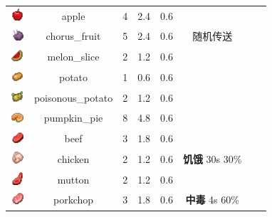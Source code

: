 \begin{center}
\begin{longtable}{c|c|ccc|ccc}
        \includegraphics[width=0.5cm,height=0.5cm]{./images/origin/apple.png} & apple & 4 & 2.4 & 0.6 &  \\
        \includegraphics[width=0.5cm,height=0.5cm]{./images/origin/chorus_fruit.png} & chorus\_fruit & 5 & 2.4 & 0.6 & 随机传送 \\ 
        \includegraphics[width=0.5cm,height=0.5cm]{./images/origin/melon_slice.png} & melon\_slice & 2 & 1.2 & 0.6 &  \\ 
        \includegraphics[width=0.5cm,height=0.5cm]{./images/origin/potato.png} & potato & 1 & 0.6 & 0.6 &  \\ 
        \includegraphics[width=0.5cm,height=0.5cm]{./images/origin/poisonous_potato.png} & poisonous\_potato & 2 & 1.2 & 0.6 &  \\ 
        \includegraphics[width=0.5cm,height=0.5cm]{./images/origin/pumpkin_pie.png} & pumpkin\_pie & 8 & 4.8 & 0.6 &  \\ 
        \includegraphics[width=0.5cm,height=0.5cm]{./images/origin/beef.png} & beef & 3 & 1.8 & 0.6 &  \\ 
        \includegraphics[width=0.5cm,height=0.5cm]{./images/origin/chicken.png} & chicken & 2 & 1.2 & 0.6 & \textbf{饥饿} 30s 30\% \\ 
        \includegraphics[width=0.5cm,height=0.5cm]{./images/origin/mutton.png} & mutton & 2 & 1.2 & 0.6 &  \\ 
        \includegraphics[width=0.5cm,height=0.5cm]{./images/origin/porkchop.png} & porkchop & 3 & 1.8 & 0.6 & \textbf{中毒} 4s 60\% \\

\end{longtable}
\end{center}
